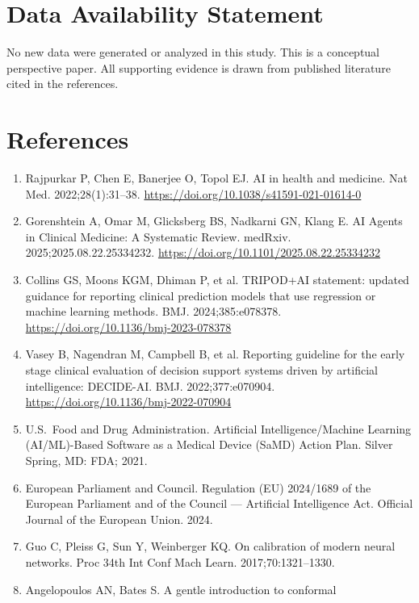 \documentclass[11pt]{article}
\begin{document}
\section*{Data Availability Statement}\label{data-availability-statement}

No new data were generated or analyzed in this study. This is a
conceptual perspective paper. All supporting evidence is drawn from
published literature cited in the references.


\section*{References}\label{references}

\begin{enumerate}
\def\labelenumi{\arabic{enumi}.}
\item
  Rajpurkar P, Chen E, Banerjee O, Topol EJ. AI in health and medicine.
  Nat Med. 2022;28(1):31--38.
  \url{https://doi.org/10.1038/s41591-021-01614-0}
\item
  Gorenshtein A, Omar M, Glicksberg BS, Nadkarni GN, Klang E. AI Agents
  in Clinical Medicine: A Systematic Review. medRxiv.
  2025;2025.08.22.25334232.
  \url{https://doi.org/10.1101/2025.08.22.25334232}
\item
  Collins GS, Moons KGM, Dhiman P, et al. TRIPOD+AI statement: updated
  guidance for reporting clinical prediction models that use regression
  or machine learning methods. BMJ. 2024;385:e078378.
  \url{https://doi.org/10.1136/bmj-2023-078378}
\item
  Vasey B, Nagendran M, Campbell B, et al. Reporting guideline for the
  early stage clinical evaluation of decision support systems driven by
  artificial intelligence: DECIDE-AI. BMJ. 2022;377:e070904.
  \url{https://doi.org/10.1136/bmj-2022-070904}
\item
  U.S.\ Food and Drug Administration. Artificial Intelligence/Machine
  Learning (AI/ML)-Based Software as a Medical Device (SaMD) Action
  Plan. Silver Spring, MD: FDA; 2021.
\item
  European Parliament and Council. Regulation (EU) 2024/1689 of the
  European Parliament and of the Council --- Artificial Intelligence
  Act. Official Journal of the European Union. 2024.
\item
  Guo C, Pleiss G, Sun Y, Weinberger KQ. On calibration of modern neural
  networks. Proc 34th Int Conf Mach Learn. 2017;70:1321--1330.
\item
  Angelopoulos AN, Bates S. A gentle introduction to conformal

\end{enumerate}
\end{document}
